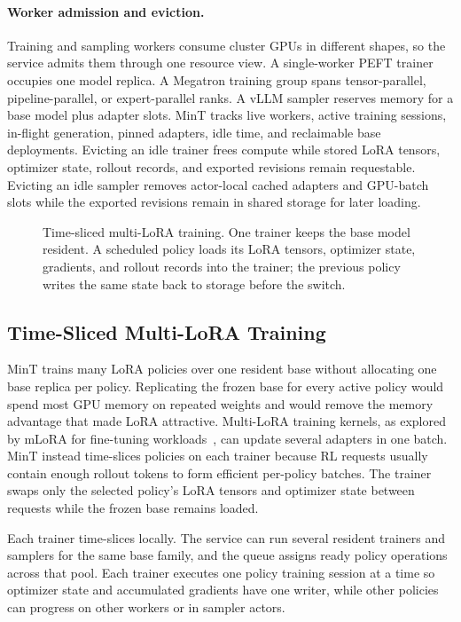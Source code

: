 \paragraph{Worker admission and eviction.}
Training and sampling workers consume cluster GPUs in different shapes, so the service admits them through one resource view. A single-worker PEFT trainer occupies one model replica. A Megatron training group spans tensor-parallel, pipeline-parallel, or expert-parallel ranks. A vLLM sampler reserves memory for a base model plus adapter slots. MinT tracks live workers, active training sessions, in-flight generation, pinned adapters, idle time, and reclaimable base deployments. Evicting an idle trainer frees compute while stored LoRA tensors, optimizer state, rollout records, and exported revisions remain requestable. Evicting an idle sampler removes actor-local cached adapters and GPU-batch slots while the exported revisions remain in shared storage for later loading.

\begin{figure}[H]
    \centering
    \resizebox{0.78\textwidth}{!}{}
    \caption{Time-sliced multi-LoRA training. One trainer keeps the base model resident. A scheduled policy loads its LoRA tensors, optimizer state, gradients, and rollout records into the trainer; the previous policy writes the same state back to storage before the switch.}
    \label{fig:mint_training_state_swap}
\end{figure}

\subsection{Time-Sliced Multi-LoRA Training}

MinT trains many LoRA policies over one resident base without allocating one base replica per policy. Replicating the frozen base for every active policy would spend most GPU memory on repeated weights and would remove the memory advantage that made LoRA attractive. Multi-LoRA training kernels, as explored by mLoRA for fine-tuning workloads~\citep{mlora2024}, can update several adapters in one batch. MinT instead time-slices policies on each trainer because RL requests usually contain enough rollout tokens to form efficient per-policy batches. The trainer swaps only the selected policy's LoRA tensors and optimizer state between requests while the frozen base remains loaded.

Each trainer time-slices locally. The service can run several resident trainers and samplers for the same base family, and the queue assigns ready policy operations across that pool. Each trainer executes one policy training session at a time so optimizer state and accumulated gradients have one writer, while other policies can progress on other workers or in sampler actors.

